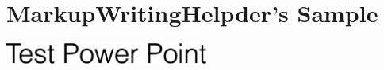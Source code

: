 \documentclass{article}
\begin{document}
\section{MarkupWritingHelpder's Sample}
\includegraphics[width=0.5\textwidth]{fig_gen/pptx1.eps}
\end{document}
